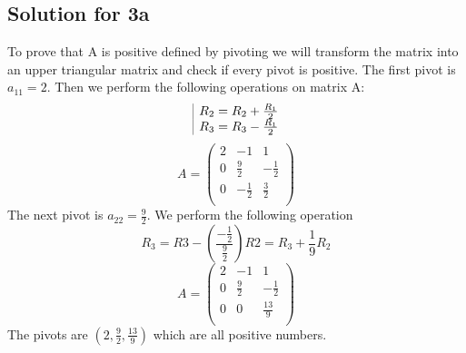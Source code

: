 \documentclass[a4paper,fleqn,12pt]{article}
\begin{document}
\subsection{Solution for 3a}
To prove that A is positive defined by pivoting we will transform the matrix into an upper triangular matrix and check if every pivot is positive. The first pivot is $a_{11} = 2$. Then we perform the following operations on matrix A: 
$$
\begin{array}{|l@{}}
	R_2 = R_2 + \frac{R_1}{2} \\
	R_3 = R_3 - \frac{R_1}{2}
\end{array}
$$
$$
A = \begin{pmatrix}
2 & -1 & 1 \\
0 & \frac{9}{2} & -\frac{1}{2} \\
0 & -\frac{1}{2} & \frac{3}{2} \\
\end{pmatrix}
$$
The next pivot is $a_{22} = \frac{9}{2}$. We perform the following operation
$$
R_3 = R3 - \left(\frac{-\frac{1}{2}}{\frac{9}{2}}\right)R2 = R_3 + \frac{1}{9} R_2
$$
$$
A = \begin{pmatrix}
2 & -1 & 1 \\
0 & \frac{9}{2} & -\frac{1}{2} \\
0 & 0 & \frac{13}{9} \\
\end{pmatrix}
$$
The pivots are $\left( 2, \frac{9}{2}, \frac{13}{9} \right)$ which are all positive numbers.

\end{document}

